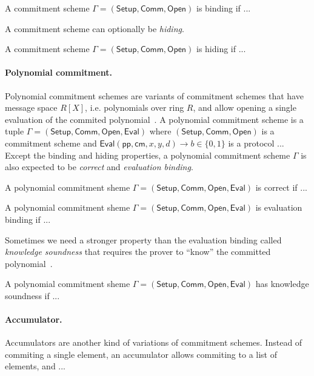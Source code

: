 \documentclass[acmtog]{acmart}
\newcommand{\Setup}{\mathsf{Setup}}
\newcommand{\Comm}{\mathsf{Comm}}
\newcommand{\Open}{\mathsf{Open}}
\newcommand{\Eval}{\mathsf{Eval}}
\newcommand{\pp}{\mathsf{pp}}
\newcommand{\cm}{\mathsf{cm}}
\begin{document}
\begin{definition}[Binding]
A commitment scheme $\Gamma=(\Setup,\Comm,\Open)$ is binding if ...
\end{definition}

A commitment scheme can optionally be \emph{hiding}.

\begin{definition}[Hiding]
A commitment scheme $\Gamma=(\Setup,\Comm,\Open)$ is hiding if ...
\end{definition}

\paragraph{Polynomial commitment.} Polynomial commitment schemes are variants of commitment schemes that have message space $R[X]$, i.e. polynomials over ring $R$, and allow opening a single evaluation of the commited polynomial~\cite{KateZG10}.
A polynomial commitment scheme is a tuple $\Gamma=(\Setup,\Comm,\Open,\Eval)$ where $(\Setup,\Comm,\Open)$ is a commitment scheme and $\Eval(\pp,\cm,x,y,d)\to b\in\{0,1\}$ is a protocol ...
Except the binding and hiding properties, a polynomial commitment scheme $\Gamma$ is also expected to be \emph{correct} and \emph{evaluation binding}.

\begin{definition}[Correct]
A polynomial commitment sheme $\Gamma=(\Setup,\Comm,\Open,\Eval)$ is correct if ...
\end{definition}

\begin{definition}
A polynomial commitment sheme $\Gamma=(\Setup,\Comm,\Open,\Eval)$ is evaluation binding if ...
\end{definition}

Sometimes we need a stronger property than the evaluation binding called \emph{knowledge soundness} that requires the prover to ``know'' the committed polynomial~\cite{BunzFS20}.

\begin{definition}
A polynomial commitment sheme $\Gamma=(\Setup,\Comm,\Open,\Eval)$ has knowledge soundness if ...
\end{definition}

\paragraph{Accumulator.}
Accumulators are another kind of variations of commitment schemes.
Instead of commiting a single element, an accumulator allows commiting to a list of elements, and ...
\end{document}
